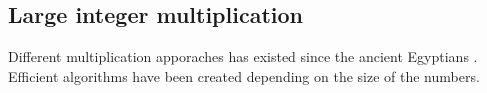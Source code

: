 
\subsection{Large integer multiplication} 
Different multiplication apporaches has existed since the ancient Egyptians \cite{ancientmult}. Efficient algorithms have been created depending on the size of the numbers. 

\pagebreak